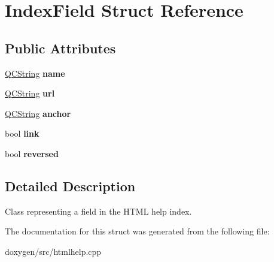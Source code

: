 \hypertarget{struct_index_field}{}\section{Index\+Field Struct Reference}
\label{struct_index_field}
\subsection*{Public Attributes}
\begin{DoxyCompactItemize}
\item 
\mbox{\label{struct_index_field_af14ea53249ef3c89f95628f395dd4b99}} 
\mbox{\hyperlink{class_q_c_string}{Q\+C\+String}} {\bfseries name}
\item 
\mbox{\label{struct_index_field_acc522969a4da3f635cce4bf571fdc9a0}} 
\mbox{\hyperlink{class_q_c_string}{Q\+C\+String}} {\bfseries url}
\item 
\mbox{\label{struct_index_field_a9de1890d236dd42b05b310638cfeda4b}} 
\mbox{\hyperlink{class_q_c_string}{Q\+C\+String}} {\bfseries anchor}
\item 
\mbox{\label{struct_index_field_ace714325ef33d35456d4ccbf5dcf227f}} 
bool {\bfseries link}
\item 
\mbox{\label{struct_index_field_a9cc482f75f35d70933dad31551f31b45}} 
bool {\bfseries reversed}
\end{DoxyCompactItemize}


\subsection{Detailed Description}
Class representing a field in the H\+T\+ML help index. 

The documentation for this struct was generated from the following file\+:\begin{DoxyCompactItemize}
\item 
doxygen/src/htmlhelp.\+cpp\end{DoxyCompactItemize}
